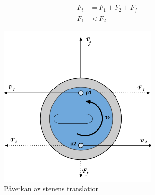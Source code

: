 \documentclass[11pt]{article} %
\begin{document}
\begin{subequations}\label{Ftot}
 \begin{align}
 \bar{F_t}&=\bar{F_1}+\bar{F_2}+\bar{F_f}\\
 \bar{F_1}&<\bar{F_2}
 \end{align}
 \end{subequations}

\begin{figure}[ht!]
\centering
\includegraphics[width=80mm]{Translation.png}
\caption{Påverkan av stenens translation}
\label{fig:Translation}
\label{overflow}
\end{figure}
\end{document}
